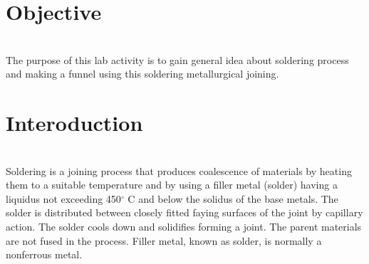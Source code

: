 \documentclass[a4,12pt]{article}
\begin{document}
	\section*{Objective}\\
The purpose of this lab activity is to gain general idea about soldering process and making a funnel using this soldering metallurgical joining.\\
\section*{Interoduction}\\
Soldering is a joining process that produces coalescence of
materials by heating them to a suitable temperature and by
using a filler metal (solder) having a liquidus not exceeding
450$^{\circ}$ C and below the solidus of the base metals. The solder is distributed between closely fitted faying
surfaces of the joint by capillary action. The solder cools down and solidifies forming a joint. The
parent materials are not fused in the process. Filler metal, known as solder, is normally a nonferrous
metal.
\end{document}
